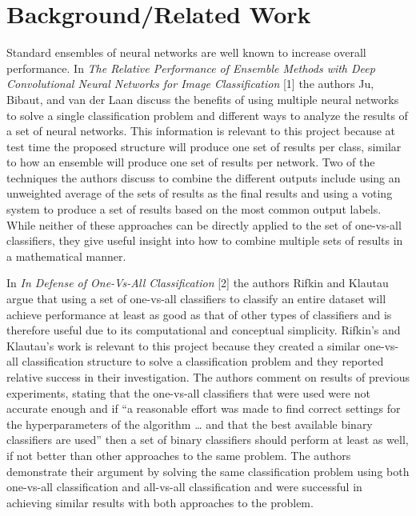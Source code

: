 \documentclass[10pt,twocolumn,letterpaper]{article}
\begin{document}
\section{Background/Related Work}
Standard ensembles of neural networks are well known to increase overall performance. In \textit{The Relative Performance of Ensemble Methods with Deep Convolutional Neural Networks for Image Classification} [1] the authors Ju, Bibaut, and van der Laan discuss the benefits of using multiple neural networks to solve a single classification problem and different ways to analyze the results of a set of neural networks. This information is relevant to this project because at test time the proposed structure will produce one set of results per class, similar to how an ensemble will produce one set of results per network. Two of the techniques the authors discuss to combine the different outputs include using an unweighted average of the sets of results as the final results and using a voting system to produce a set of results based on the most common output labels. While neither of these approaches can be directly applied to the set of one-vs-all classifiers, they give useful insight into how to combine multiple sets of results in a mathematical manner.

In \textit{In Defense of One-Vs-All Classification} [2] the authors Rifkin and Klautau argue that using a set of one-vs-all classifiers to classify an entire dataset will achieve performance at least as good as that of other types of classifiers and is therefore useful due to its computational and conceptual simplicity. Rifkin’s and Klautau’s work is relevant to this project because they created a similar one-vs-all classification structure to solve a classification problem and they reported relative success in their investigation. The authors comment on results of previous experiments, stating that the one-vs-all classifiers that were used were not accurate enough and if “a reasonable effort was made to find correct settings for the hyperparameters of the algorithm … and that the best available binary classifiers are used” then a set of binary classifiers should perform at least as well, if not better than other approaches to the same problem. The authors demonstrate their argument by solving the same classification problem using both one-vs-all classification and all-vs-all classification and were successful in achieving similar results with both approaches to the problem.
\end{document}
